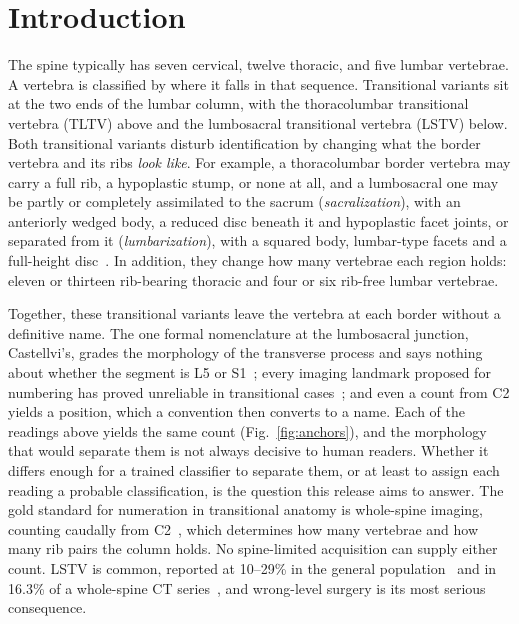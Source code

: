 \documentclass[aapm,mph,amsmath,amssymb,reprint]{revtex4-2}
\begin{document}
\maketitle

\section{Introduction}

The spine typically has seven cervical, twelve thoracic, and five lumbar vertebrae. A
vertebra is classified by where it falls in that sequence. Transitional variants sit at the
two ends of the lumbar column, with the thoracolumbar transitional vertebra (TLTV) above and the
lumbosacral transitional vertebra (LSTV) below. Both transitional variants disturb identification by changing what the border vertebra
and its ribs \emph{look like}. For example, a thoracolumbar border vertebra may carry a full rib, a hypoplastic stump, or none at all, and
a lumbosacral one may be partly or completely assimilated to the sacrum
(\emph{sacralization}), with an anteriorly wedged body, a reduced disc beneath it and
hypoplastic facet joints, or separated from it (\emph{lumbarization}), with a
squared body, lumbar-type facets and a full-height disc~\cite{koninwalz2010}. In addition, they
change how many vertebrae each region holds: eleven or thirteen rib-bearing thoracic and four or six rib-free lumbar vertebrae.

Together, these transitional variants leave the vertebra at each border without a definitive name. The one formal nomenclature at the lumbosacral junction, Castellvi's, grades the morphology of the transverse process and says nothing about whether the segment is L5 or S1~\cite{castellvi1984,koninwalz2010}; every imaging landmark proposed for numbering has proved unreliable in transitional cases~\cite{carrino2011,farshad2015,tureli2014}; and even a count from C2 yields a position, which a convention then converts to a name. Each of the readings above yields the same count (Fig.~\ref{fig:anchors}), and the morphology that would
separate them is not always decisive to human readers. Whether it differs
enough for a trained classifier to separate them, or at least to assign each reading a probable classification,
is the question this release aims to answer. The gold standard for numeration in
transitional anatomy is whole-spine imaging, counting caudally from C2~\cite{lian2018},
which determines how many vertebrae and how many rib pairs the column holds. No
spine-limited acquisition can supply either count. LSTV is common, reported at 10--29\% in the general
population~\cite{hanhivaara2022} and in 16.3\% of a whole-spine CT
series~\cite{nagata2025}, and wrong-level surgery is its most serious consequence.
\end{document}
